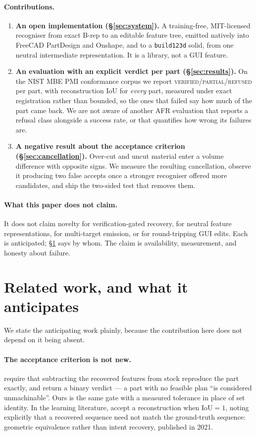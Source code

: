 \documentclass[11pt]{article}
\newcommand{\code}[1]{\texttt{\small #1}}
\newcommand{\VERIFIED}{\textsc{verified}}
\newcommand{\PARTIAL}{\textsc{partial}}
\newcommand{\REFUSED}{\textsc{refused}}
\begin{document}
\paragraph{Contributions.}
\begin{enumerate}
\item \textbf{An open implementation (\S\ref{sec:system}).} A training-free,
  MIT-licensed recogniser from exact B-rep to an editable feature tree, emitted
  natively into FreeCAD PartDesign and Onshape, and to a \code{build123d} solid,
  from one neutral intermediate representation. It is a library, not a GUI
  feature.
\item \textbf{An evaluation with an explicit verdict per part
  (\S\ref{sec:results}).} On the NIST MBE PMI conformance corpus we report
  \VERIFIED{}/\PARTIAL{}/\REFUSED{} per part, with reconstruction IoU for
  \emph{every} part, measured under exact registration rather than bounded, so
  the ones that failed say how much of the part came back. We are not aware of another AFR evaluation that
  reports a refusal class alongside a success rate, or that quantifies how wrong
  its failures are.
\item \textbf{A negative result about the acceptance criterion
  (\S\ref{sec:cancellation}).} Over-cut and uncut material enter a volume
  difference with opposite signs. We measure the resulting cancellation, observe
  it producing two false accepts once a stronger recogniser offered more
  candidates, and ship the two-sided test that removes them.
\end{enumerate}

\paragraph{What this paper does not claim.} It does not claim novelty for
verification-gated recovery, for neutral feature representations, for
multi-target emission, or for round-tripping GUI edits. Each is anticipated;
\S\ref{sec:related} says by whom. The claim is availability, measurement, and
honesty about failure.

\section{Related work, and what it anticipates}
\label{sec:related}

We state the anticipating work plainly, because the contribution here does not
depend on it being absent.

\paragraph{The acceptance criterion is not new.} \citet{TODO-gupta-nau} require
that subtracting the recovered features from stock reproduce the part exactly,
and return a binary verdict --- a part with no feasible plan ``is considered
unmachinable''. Ours is the same gate with a measured tolerance in place of set
identity. In the learning literature, \citet{TODO-willis-fusion} accept a
reconstruction when IoU${}=1$, noting explicitly that a recovered sequence need
not match the ground-truth sequence: geometric equivalence rather than intent
recovery, published in 2021.
\end{document}
